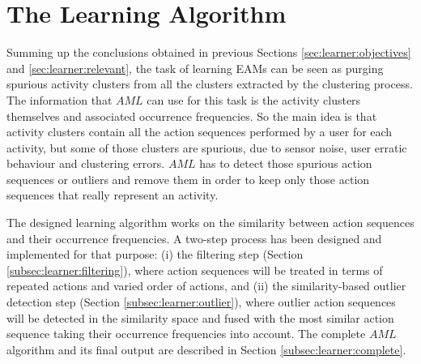 \section{The Learning Algorithm}
\label{sec:learner:algorithm}






Summing up the conclusions obtained in previous Sections \ref{sec:learner:objectives} and \ref{sec:learner:relevant}, the task of learning EAMs can be seen as purging spurious activity clusters from all the clusters extracted by the clustering process. The information that $AML$ can use for this task is the activity clusters themselves and associated occurrence frequencies. So the main idea is that activity clusters contain all the action sequences performed by a user for each activity, but some of those clusters are spurious, due to sensor noise, user erratic behaviour and clustering errors. $AML$ has to detect those spurious action sequences or outliers and remove them in order to keep only those action sequences that really represent an activity.

The designed learning algorithm works on the similarity between action sequences and their occurrence frequencies. A two-step process has been designed and implemented for that purpose: (i) the filtering step (Section \ref{subsec:learner:filtering}), where action sequences will be treated in terms of repeated actions and varied order of actions, and (ii) the similarity-based outlier detection step (Section \ref{subsec:learner:outlier}), where outlier action sequences will be detected in the similarity space and fused with the most similar action sequence taking their occurrence frequencies into account. The complete $AML$ algorithm and its final output are described in Section \ref{subsec:learner:complete}.

